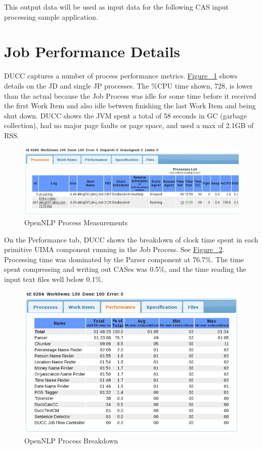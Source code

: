 This output data will be used as input data for the following CAS input processing sample application.

\section{Job Performance Details}
DUCC captures a number of process performance metrics.
\hyperref[fig:OpenNLP-Process-Measurements]{Figure ~\ref{fig:OpenNLP-Process-Measurements}} shows details on the JD and 
single JP processes. The \%CPU time shown, 728, is lower than the actual because the Job Process was idle 
for some time before it received the first Work Item and also idle between finishing the last Work Item and being shut down.
DUCC shows the JVM spent a total of 58 seconds in 
GC (garbage collection), had no major page faults or page space, and used a max of 2.1GB of RSS.

\begin{figure}[H]
  \centering
  \includegraphics[width=7in]{images/BooksRaw.png}
  \caption{OpenNLP Process Measurements}
  \label{fig:OpenNLP-Process-Measurements}
\end{figure}

On the Performance tab, DUCC shows the breakdown of clock time spent in each primitive UIMA component running in the 
Job Process. See \hyperref[fig:OpenNLP-Process-Breakdown]{Figure ~\ref{fig:OpenNLP-Process-Breakdown}}.
Processing time was dominated by the Parser component at 76.7\%. The time spent compressing and writing out CASes 
was 0.5\%, and the time reading the input text files well below 0.1\%.

\begin{figure}[H]
  \centering
  \includegraphics[width=5.5in]{images/BooksRawPerf.png}
  \caption{OpenNLP Process Breakdown}
  \label{fig:OpenNLP-Process-Breakdown}
\end{figure}


